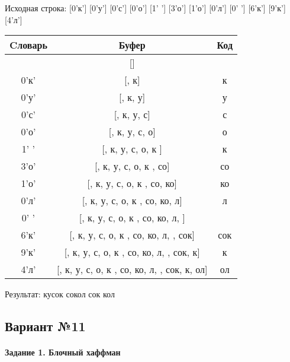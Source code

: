 \documentclass[a4paper, 12pt]{article}
\begin{document}
Исходная строка: [0'к'] [0'у'] [0'с'] [0'о'] [1' '] [3'о'] [1'о'] [0'л'] [0' '] [6'к'] [9'к'] [4'л']\\
\begin{table}[h!]
\centering
\begin{tabular}{|c|c|c|}
\hline
 Cловарь & Буфер & Код  \\ \hline
 & [] & 
\\ \hline
0'к' & [, к] & к
\\ \hline
0'у' & [, к, у] & у
\\ \hline
0'с' & [, к, у, с] & с
\\ \hline
0'о' & [, к, у, с, о] & о
\\ \hline
1' ' & [, к, у, с, о, к ] & к 
\\ \hline
3'о' & [, к, у, с, о, к , со] & со
\\ \hline
1'о' & [, к, у, с, о, к , со, ко] & ко
\\ \hline
0'л' & [, к, у, с, о, к , со, ко, л] & л
\\ \hline
0' ' & [, к, у, с, о, к , со, ко, л,  ] &  
\\ \hline
6'к' & [, к, у, с, о, к , со, ко, л,  , сок] & сок
\\ \hline
9'к' & [, к, у, с, о, к , со, ко, л,  , сок,  к] &  к
\\ \hline
4'л' & [, к, у, с, о, к , со, ко, л,  , сок,  к, ол] & ол
\\ \hline
\end{tabular}
\end{table}

Результат: кусок сокол сок кол
\pagebreak
\subsection{Вариант №11}
\paragraph{Задание 1. Блочный хаффман \\}
\end{document}
